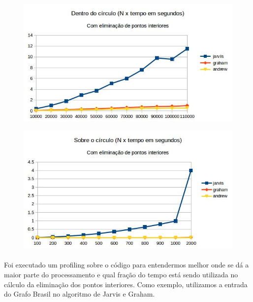 \documentclass[11pt,a4paper]{article}
\begin{document}
            \begin{figure}[!htb]
              \begin{minipage}[b]{\textwidth}
              \centering
                  \includegraphics[width=\linewidth]{graph_circulo_yes}
                  \label{fig:map}
                \end{minipage}
              \begin{minipage}[b]{\textwidth}
              \centering
                  \includegraphics[width=\linewidth]{graph_sobre_circulo_yes}
                  \label{fig:map}
                \end{minipage}
                \caption{}
        \end{figure}

        \paragraph{}
        Foi executado um profiling sobre o código para entendermos melhor onde se dá a maior parte do processamento e qual fração do tempo está sendo utilizada no cálculo da eliminação dos pontos interiores. Como exemplo, utilizamos a entrada do Grafo Brasil no algoritmo de Jarvis e Graham.
\end{document}
